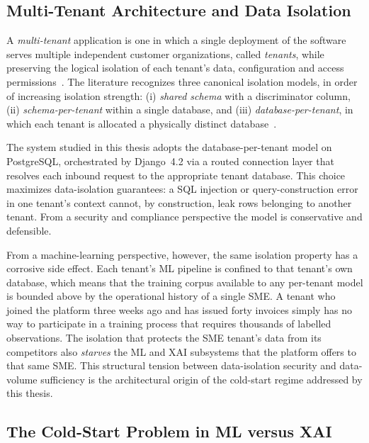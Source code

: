 \subsection{Multi-Tenant Architecture and Data Isolation}
\label{subsec:multi-tenant}

A \emph{multi-tenant} application is one in which a single deployment of the
software serves multiple independent customer organizations, called
\emph{tenants}, while preserving the logical isolation of each tenant's data,
configuration and access permissions~\citep{bezemer2010multi}. The literature
recognizes three canonical isolation models, in order of increasing isolation
strength: (i) \emph{shared schema} with a discriminator column,
(ii) \emph{schema-per-tenant} within a single database, and
(iii) \emph{database-per-tenant}, in which each tenant is allocated a
physically distinct database~\citep{krebs2014multitenancy}.

The system studied in this thesis adopts the database-per-tenant model on
PostgreSQL, orchestrated by Django~4.2 via a routed connection layer that
resolves each inbound request to the appropriate tenant database. This choice
maximizes data-isolation guarantees: a SQL injection or query-construction
error in one tenant's context cannot, by construction, leak rows belonging to
another tenant. From a security and compliance perspective the model is
conservative and defensible.

From a machine-learning perspective, however, the same isolation property has
a corrosive side effect. Each tenant's ML pipeline is confined to that
tenant's own database, which means that the training corpus available to any
per-tenant model is bounded above by the operational history of a single SME.
A tenant who joined the platform three weeks ago and has issued forty invoices
simply has no way to participate in a training process that requires thousands
of labelled observations. The isolation that protects the SME tenant's data
from its competitors also \emph{starves} the ML and XAI subsystems that the
platform offers to that same SME. This structural tension between
data-isolation security and data-volume sufficiency is the architectural
origin of the cold-start regime addressed by this thesis.

\subsection{The Cold-Start Problem in ML versus XAI}
\label{subsec:cold-start}

